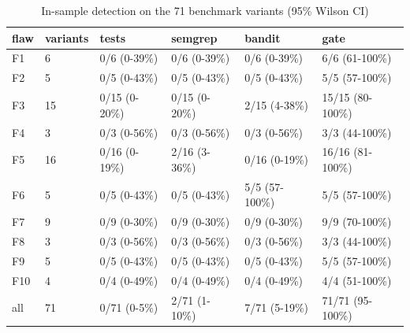 \begin{table}[t]
\centering
\caption{In-sample detection on the 71 benchmark variants (95\% Wilson CI)}
\small
\begin{tabular}{llllll}
\hline
flaw & variants & tests & semgrep & bandit & gate \\
\hline
F1 & 6 & 0/6 (0-39\%) & 0/6 (0-39\%) & 0/6 (0-39\%) & 6/6 (61-100\%) \\
F2 & 5 & 0/5 (0-43\%) & 0/5 (0-43\%) & 0/5 (0-43\%) & 5/5 (57-100\%) \\
F3 & 15 & 0/15 (0-20\%) & 0/15 (0-20\%) & 2/15 (4-38\%) & 15/15 (80-100\%) \\
F4 & 3 & 0/3 (0-56\%) & 0/3 (0-56\%) & 0/3 (0-56\%) & 3/3 (44-100\%) \\
F5 & 16 & 0/16 (0-19\%) & 2/16 (3-36\%) & 0/16 (0-19\%) & 16/16 (81-100\%) \\
F6 & 5 & 0/5 (0-43\%) & 0/5 (0-43\%) & 5/5 (57-100\%) & 5/5 (57-100\%) \\
F7 & 9 & 0/9 (0-30\%) & 0/9 (0-30\%) & 0/9 (0-30\%) & 9/9 (70-100\%) \\
F8 & 3 & 0/3 (0-56\%) & 0/3 (0-56\%) & 0/3 (0-56\%) & 3/3 (44-100\%) \\
F9 & 5 & 0/5 (0-43\%) & 0/5 (0-43\%) & 0/5 (0-43\%) & 5/5 (57-100\%) \\
F10 & 4 & 0/4 (0-49\%) & 0/4 (0-49\%) & 0/4 (0-49\%) & 4/4 (51-100\%) \\
all & 71 & 0/71 (0-5\%) & 2/71 (1-10\%) & 7/71 (5-19\%) & 71/71 (95-100\%) \\
\hline
\end{tabular}
\end{table}
